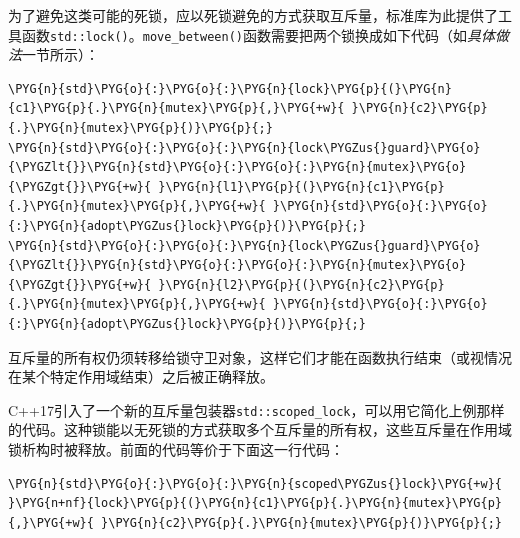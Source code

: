 
为了避免这类可能的死锁，应以死锁避免的方式获取互斥量，标准库为此提供了工具函数\texttt{std::\allowbreak{}lock()}。\texttt{move\_\allowbreak{}between()}函数需要把两个锁换成如下代码（如\textit{具体做法}一节所示）：



\begin{codeblockbg}
\begin{Verbatim}[commandchars=\\\{\},breaklines=true,breakanywhere=true,fontsize=\codefont,xleftmargin=17bp]
\PYG{n}{std}\PYG{o}{:}\PYG{o}{:}\PYG{n}{lock}\PYG{p}{(}\PYG{n}{c1}\PYG{p}{.}\PYG{n}{mutex}\PYG{p}{,}\PYG{+w}{ }\PYG{n}{c2}\PYG{p}{.}\PYG{n}{mutex}\PYG{p}{)}\PYG{p}{;}
\PYG{n}{std}\PYG{o}{:}\PYG{o}{:}\PYG{n}{lock\PYGZus{}guard}\PYG{o}{\PYGZlt{}}\PYG{n}{std}\PYG{o}{:}\PYG{o}{:}\PYG{n}{mutex}\PYG{o}{\PYGZgt{}}\PYG{+w}{ }\PYG{n}{l1}\PYG{p}{(}\PYG{n}{c1}\PYG{p}{.}\PYG{n}{mutex}\PYG{p}{,}\PYG{+w}{ }\PYG{n}{std}\PYG{o}{:}\PYG{o}{:}\PYG{n}{adopt\PYGZus{}lock}\PYG{p}{)}\PYG{p}{;}
\PYG{n}{std}\PYG{o}{:}\PYG{o}{:}\PYG{n}{lock\PYGZus{}guard}\PYG{o}{\PYGZlt{}}\PYG{n}{std}\PYG{o}{:}\PYG{o}{:}\PYG{n}{mutex}\PYG{o}{\PYGZgt{}}\PYG{+w}{ }\PYG{n}{l2}\PYG{p}{(}\PYG{n}{c2}\PYG{p}{.}\PYG{n}{mutex}\PYG{p}{,}\PYG{+w}{ }\PYG{n}{std}\PYG{o}{:}\PYG{o}{:}\PYG{n}{adopt\PYGZus{}lock}\PYG{p}{)}\PYG{p}{;}
\end{Verbatim}
\end{codeblockbg}



互斥量的所有权仍须转移给锁守卫对象，这样它们才能在函数执行结束（或视情况在某个特定作用域结束）之后被正确释放。



C++17引入了一个新的互斥量包装器\texttt{std::\allowbreak{}scoped\_\allowbreak{}lock}，可以用它简化上例那样的代码。这种锁能以无死锁的方式获取多个互斥量的所有权，这些互斥量在作用域锁析构时被释放。前面的代码等价于下面这一行代码：



\begin{codeblockbg}
\begin{Verbatim}[commandchars=\\\{\},breaklines=true,breakanywhere=true,fontsize=\codefont,xleftmargin=17bp]
\PYG{n}{std}\PYG{o}{:}\PYG{o}{:}\PYG{n}{scoped\PYGZus{}lock}\PYG{+w}{ }\PYG{n+nf}{lock}\PYG{p}{(}\PYG{n}{c1}\PYG{p}{.}\PYG{n}{mutex}\PYG{p}{,}\PYG{+w}{ }\PYG{n}{c2}\PYG{p}{.}\PYG{n}{mutex}\PYG{p}{)}\PYG{p}{;}
\end{Verbatim}
\end{codeblockbg}


